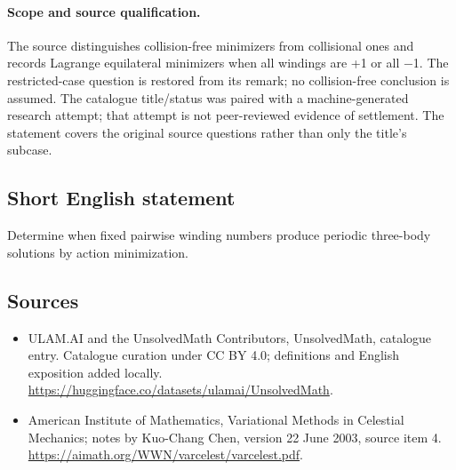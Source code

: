 \documentclass[11pt]{article}
\begin{document}
\paragraph{Scope and source qualification.}The source distinguishes collision-free minimizers from collisional ones and records Lagrange equilateral minimizers when all windings are +1 or all −1. The restricted-case question is restored from its remark; no collision-free conclusion is assumed. The catalogue title/status was paired with a machine-generated research attempt; that attempt is not peer-reviewed evidence of settlement. The statement covers the original source questions rather than only the title’s subcase.
\subsection{Short English statement}
Determine when fixed pairwise winding numbers produce periodic three-body solutions by action minimization.
\subsection{Sources}
\begin{itemize}
\item[\hypertarget{source:statement:1}{S1}] ULAM.AI and the UnsolvedMath Contributors, UnsolvedMath, catalogue entry. Catalogue curation under CC BY 4.0; definitions and English exposition added locally.
\url{https://huggingface.co/datasets/ulamai/UnsolvedMath}.
\item[\hypertarget{source:statement:2}{S2}] American Institute of Mathematics, Variational Methods in Celestial Mechanics; notes by Kuo-Chang Chen, version 22 June 2003, source item 4.
\url{https://aimath.org/WWN/varcelest/varcelest.pdf}.
\end{itemize}
\label{end:statement}
\end{document}
